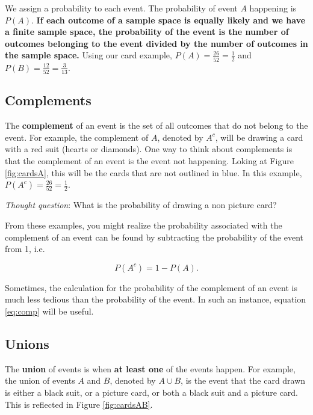 \documentclass[
]{book}
\begin{document}
We assign a probability to each event. The probability of event \(A\) happening is \(P(A)\). \textbf{If each outcome of a sample space is equally likely and we have a finite sample space, the probability of the event is the number of outcomes belonging to the event divided by the number of outcomes in the sample space.} Using our card example, \(P(A) = \frac{26}{52} = \frac{1}{2}\) and \(P(B) = \frac{12}{52} = \frac{3}{13}\).

\subsection{Complements}\label{complements}

The \textbf{complement} of an event is the set of all outcomes that do not belong to the event. For example, the complement of \(A\), denoted by \(A^c\), will be drawing a card with a red suit (hearts or diamonds). One way to think about complements is that the complement of an event is the event not happening. Loking at Figure \ref{fig:cardsA}, this will be the cards that are not outlined in blue. In this example, \(P(A^c) = \frac{26}{52} = \frac{1}{2}\).

\emph{Thought question}: What is the probability of drawing a non picture card?

From these examples, you might realize the probability associated with the complement of an event can be found by subtracting the probability of the event from 1, i.e.

\begin{equation} 
P(A^c) = 1 - P(A).
\label{eq:comp}
\end{equation}

Sometimes, the calculation for the probability of the complement of an event is much less tedious than the probability of the event. In such an instance, equation \eqref{eq:comp} will be useful.

\subsection{Unions}\label{unions}

The \textbf{union} of events is when \textbf{at least one} of the events happen. For example, the union of events \(A\) and \(B\), denoted by \(A \cup B\), is the event that the card drawn is either a black suit, or a picture card, or both a black suit and a picture card. This is reflected in Figure \ref{fig:cardsAB}.
\end{document}
